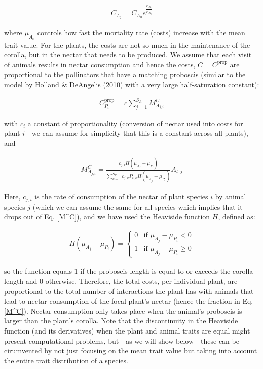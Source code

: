 \documentclass[a4paper,12pt]{article}
\begin{document}
\begin{align}
    C_{A_j} = C_{A_0} e^{\frac{\mu_{A_j}}{\mu_{A_0}}}
    \label{Animal_costs}
\end{align}

\noindent where $\mu_{A_0}$ controls how fast the mortality rate (costs) increase with the mean trait value. For the plants, the costs are not so much in the maintenance of the corolla, but in the nectar that needs to be produced. We assume that each visit of animals results in nectar consumption and hence the costs, $C = C^\mathrm{prop}$ are proportional to the pollinators that have a matching proboscis (similar to the model by Holland \& DeAngelis (2010) with a very large half-saturation constant):

\begin{align}
    C^\mathrm{prop}_{P_i} = c \sum^{S_A}_{j = 1} M^C_{A_{j,i}}
\end{align}

\noindent with $c_i$ a constant of proportionality (conversion of nectar used into costs for plant $i$ - we can assume for simplicity that this is a constant across all plants), and

\begin{align}
    M^C_{A_{j,i}} = \frac{ c_{j,i} H(\mu_{A_j} - \mu_{P_i}) }{\sum^{S_P}_{k = 1} c_{j,k} P_{t,k} H(\mu_{A_j} - \mu_{P_k}) } A_{t,j}  
    \label{M^C}
\end{align}

\noindent Here, $c_{j,i}$ is the rate of consumption of the nectar of plant species $i$ by animal species $j$ (which we can assume the same for all species which implies that it drops out of Eq. \ref{M^C}), and we have used the Heaviside function $H$, defined as:

\begin{align}
    H(\mu_{A_j} - \mu_{P_i}) = \begin{cases}
0 & \text{if } \mu_{A_j} - \mu_{P_i} < 0 \\
1 & \text{if } \mu_{A_j} - \mu_{P_i} \geq 0
\end{cases}
\end{align}

\noindent so the function equals 1 if the proboscis length is equal to or exceeds the corolla length and 0 otherwise. Therefore, the total costs, per individual plant, are proportional to the total number of interactions the plant has with animals that lead to nectar consumption of the focal plant's nectar (hence the fraction in Eq. \ref{M^C}). Nectar consumption only takes place when the animal's proboscis is larger than the plant's corolla.
Note that the discontinuity in the Heaviside function (and its derivatives) when the plant and animal traits are equal might present computational problems, but - as we will show below - these can be cirumvented by not just focusing on the mean trait value but taking into account the entire trait distribution of a species.
\end{document}
